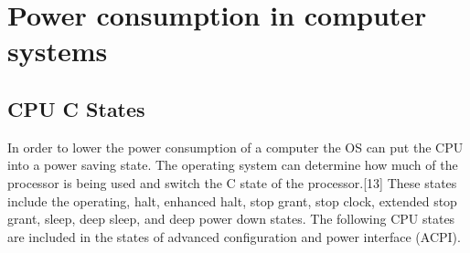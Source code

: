 \documentclass{article}
\begin{document}
\section{Power consumption in computer systems}
\subsection{CPU C States}

In order to lower the power consumption of a computer the OS can put the CPU into a power saving state. The operating system can determine how much of the processor is being used and switch the C state of the processor.[13] These states include the operating, halt, enhanced halt, stop grant, stop clock, extended stop grant, sleep, deep sleep, and deep power down states. The following CPU states are included in the states of advanced configuration and power interface (ACPI).
\end{document}

